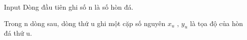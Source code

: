 Input
Dòng đầu tiên ghi số n là số hòn đá.  

   Trong n dòng sau, dòng thứ u ghi một cặp số nguyên $x_{u}$   , $y_{u}$   là tọa độ của hòn đá thứ u.